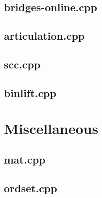 \documentclass[a4paper, twocolumn]{article}
\begin{document}
\subsection{bridges-online.cpp}

\subsection{articulation.cpp}

\subsection{scc.cpp}

\subsection{binlift.cpp}



\section{Miscellaneous}
\subsection{mat.cpp}


\subsection{ordset.cpp}

\end{document}
